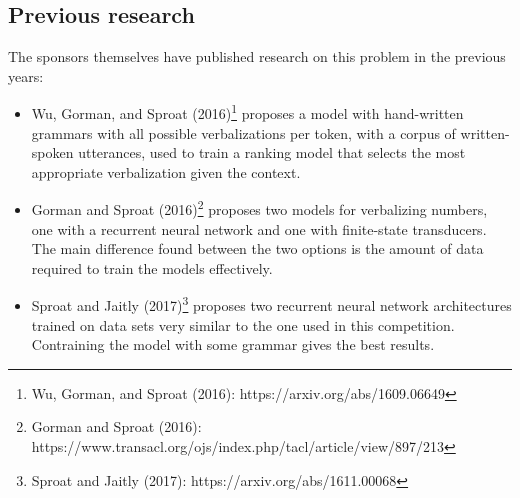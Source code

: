 \documentclass[a4paper, 9pt]{extarticle}
\begin{document}
\subsection{Previous research}\vspace{-1mm}
The sponsors themselves have published research on this problem in the previous years:
\begin{itemize}
    \itemsep-0.3em
    \item Wu, Gorman, and Sproat (2016)\footnote{Wu, Gorman, and Sproat (2016): https://arxiv.org/abs/1609.06649} proposes a model with hand-written grammars with all possible verbalizations per token, with a corpus of written-spoken utterances, used to train a ranking model that selects the most appropriate verbalization given the context.
    \item Gorman and Sproat (2016)\footnote{Gorman and Sproat (2016): https://www.transacl.org/ojs/index.php/tacl/article/view/897/213} proposes two models for verbalizing numbers, one with a recurrent neural network and one with finite-state transducers. The main difference found between the two options is the amount of data required to train the models effectively.
    \item Sproat and Jaitly (2017)\footnote{Sproat and Jaitly (2017): https://arxiv.org/abs/1611.00068} proposes two recurrent neural network architectures trained on data sets very similar to the one used in this competition. Contraining the model with some grammar gives the best results.
\end{itemize}
\end{document}
